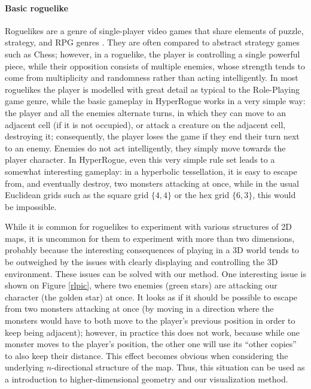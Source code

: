 \documentclass{article}
\begin{document}
\paragraph{Basic roguelike} Roguelikes are a genre of single-player video games that share elements of puzzle, strategy,
and RPG genres \cite{craddock}. They are often compared to abstract strategy games such as Chess; however, in a roguelike,
the player is controlling a single powerful piece, while their opposition consists of multiple enemies, whose strength
tends to come from multiplicity and randomness rather than acting intelligently. In most roguelikes the player is modelled
with great detail as typical to the Role-Playing game genre, while the basic gameplay in HyperRogue \cite{hyperrogue} works
in a very simple way: the player and all the enemies alternate turns, in which they can move to an adjacent cell (if it is
not occupied), or attack a creature on the adjacent cell, destroying it; consequently, the player loses the game if they end
their turn next to an enemy. Enemies do not act intelligently, they simply move towards the player
character. In HyperRogue, even this very simple rule set leads to a somewhat interesting gameplay: in a hyperbolic tessellation,
it is easy to escape from, and eventually destroy, two monsters attacking at once, while in the usual Euclidean grids such as
the square grid $\{4,4\}$ or the hex grid $\{6,3\}$, this would be impossible.

While it is common for roguelikes to experiment with various structures of 2D maps, it is uncommon for them to experiment with
more than two dimensions, probably because the interesting consequences of playing in a 3D world tends to be outweighed by the
issues with clearly displaying and controlling the 3D environment. These issues can be solved with our method. One interesting
issue is shown on Figure \ref{rlpic}, where two enemies (green stars) are attacking our character (the golden star) at once.
It looks as if it should be possible to escape from two monsters
attacking at once (by moving in a direction where the monsters would have to both move to the player's previous position in
order to keep being adjacent); however, in practice this does not work, because while one monster moves to the player's position,
the other one will use its ``other copies'' to also keep their distance. This effect becomes obvious when considering the underlying
$n$-directional structure of the map. Thus, this situation can be used as a introduction to higher-dimensional geometry and our
visualization method.
\end{document}
